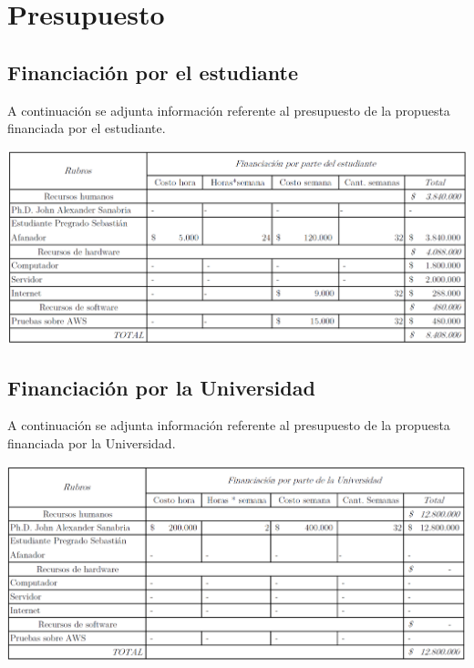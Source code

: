 
\chapter{Presupuesto} %

\label{ch:presupuesto} %
\section{Financiación por el estudiante}
A continuación se adjunta información referente al presupuesto de la propuesta financiada por el estudiante.
\begin{center}
    \includegraphics[width=\textwidth]{gfx/estudiante.png}
\end{center}

\section{Financiación por la Universidad}
A continuación se adjunta información referente al presupuesto de la propuesta financiada por la Universidad.
\begin{center}
    \includegraphics[width=\textwidth]{gfx/universidad.png}
\end{center}
